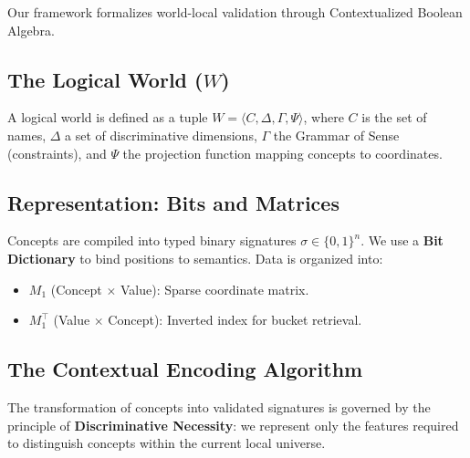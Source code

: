 \documentclass{article}
\begin{document}
Our framework formalizes world-local validation through Contextualized Boolean Algebra.

\subsection{The Logical World ($W$)}
A logical world is defined as a tuple $W = \langle C, \Delta, \Gamma, \Psi \rangle$, where $C$ is the set of names, $\Delta$ a set of discriminative dimensions, $\Gamma$ the Grammar of Sense (constraints), and $\Psi$ the projection function mapping concepts to coordinates.

\subsection{Representation: Bits and Matrices}
Concepts are compiled into typed binary signatures $\sigma \in \{0, 1\}^n$. We use a \textbf{Bit Dictionary} to bind positions to semantics. Data is organized into:
\begin{itemize}
    \item $M_1$ (Concept $\times$ Value): Sparse coordinate matrix.
    \item $M_1^\intercal$ (Value $\times$ Concept): Inverted index for bucket retrieval.
\end{itemize}

\subsection{The Contextual Encoding Algorithm}
The transformation of concepts into validated signatures is governed by the principle of \textbf{Discriminative Necessity}: we represent only the features required to distinguish concepts within the current local universe. 
\end{document}

